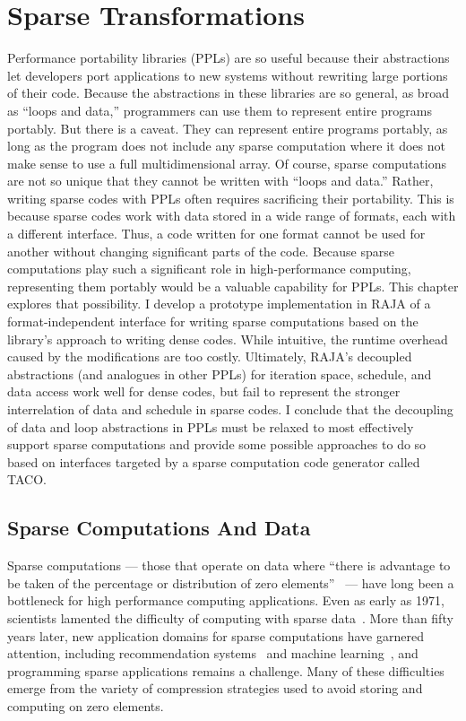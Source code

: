 \chapter{Sparse Transformations}\label{chap:SparseRAJA}

Performance portability libraries (PPLs) are so useful because their abstractions let developers port applications to new systems without rewriting large portions of their code.
Because the abstractions in these libraries are so general, as broad as ``loops and data,'' programmers can use them to represent entire programs portably.
But there is a caveat. 
They can represent entire programs portably, as long as the program does not include any sparse computation where it does not make sense to use a full multidimensional array.
Of course, sparse computations are not so unique that they cannot be written with ``loops and data.''
Rather, writing sparse codes with PPLs often requires sacrificing their portability.
This is because sparse codes work with data stored in a wide range of formats, each with a different interface.
Thus, a code written for one format cannot be used for another without changing significant parts of the code.
Because sparse computations play such a significant role in high-performance computing, representing them portably would be a valuable capability for PPLs\@.
This chapter explores that possibility.
I develop a prototype implementation in RAJA of a format-independent interface for writing sparse computations based on the library's approach to writing dense codes.
While intuitive, the runtime overhead caused by the modifications are too costly.
Ultimately, RAJA's decoupled abstractions (and analogues in other PPLs) for iteration space, schedule, and data access work well for dense codes, but fail to represent the stronger interrelation of data and schedule in sparse codes.
I conclude that the decoupling of data and loop abstractions in PPLs must be relaxed to most effectively support sparse computations and provide some possible approaches to do so based on interfaces targeted by a sparse computation code generator called TACO\@.


\section{Sparse Computations And Data}

Sparse computations --- those that operate on data where ``there is advantage to be taken of the percentage or distribution of zero elements''~\cite{duff1977survey} --- have long been a bottleneck for high performance computing applications. 
Even as early as 1971, scientists lamented the difficulty of computing with sparse data~\cite{willoughby1971sparse}.
More than fifty years later, new application domains for sparse computations have garnered attention, including recommendation systems~\cite{he2016fusing} and machine learning~\cite{zhao2018bridging,zhu2019sparse}, and programming sparse applications remains a challenge.
Many of these difficulties emerge from the variety of compression strategies used to avoid storing and computing on zero elements.


